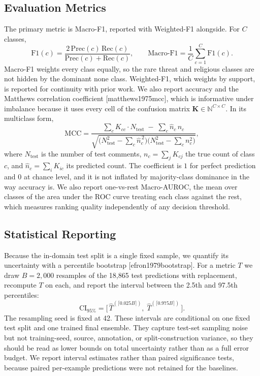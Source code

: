 \documentclass[11pt,a4paper]{article}
\def\citep#1{[#1]}%
\def\emph#1{#1}%
\begin{document}
\subsection{Evaluation Metrics}
\label{sec:metrics}

The primary metric is Macro-F1, reported with Weighted-F1 alongside. For $C$ classes,
\begin{equation}
\mathrm{F1}(c) = \frac{2\,\mathrm{Prec}(c)\,\mathrm{Rec}(c)}{\mathrm{Prec}(c) + \mathrm{Rec}(c)},
\qquad
\text{Macro-F1} = \frac{1}{C}\sum_{c=1}^{C} \mathrm{F1}(c).
\label{eq:macrof1}
\end{equation}
Macro-F1 weights every class equally, so the rare \emph{threat} and \emph{religious} classes are not hidden by the dominant \emph{none} class. Weighted-F1, which weights by support, is reported for continuity with prior work. We also report accuracy and the Matthews correlation coefficient \citep{matthews1975mcc}, which is informative under imbalance because it uses every cell of the confusion matrix $\mathbf{K} \in \mathbb{N}^{C \times C}$. In its multiclass form,
\begin{equation}
\mathrm{MCC} =
\frac{\sum_{c} K_{cc} \cdot N_{\mathrm{test}} \;-\; \sum_{c} \hat{n}_c\, n_c}
{\sqrt{\big(N_{\mathrm{test}}^2 - \sum_{c} \hat{n}_c^{\,2}\big)\big(N_{\mathrm{test}}^2 - \sum_{c} n_c^{2}\big)}},
\label{eq:mcc}
\end{equation}
where $N_{\mathrm{test}}$ is the number of test comments, $n_c = \sum_{j} K_{cj}$ the true count of class $c$, and $\hat{n}_c = \sum_{i} K_{ic}$ its predicted count. The coefficient is $1$ for perfect prediction and $0$ at chance level, and it is not inflated by majority-class dominance in the way accuracy is. We also report one-vs-rest Macro-AUROC, the mean over classes of the area under the ROC curve treating each class against the rest, which measures ranking quality independently of any decision threshold.

\subsection{Statistical Reporting}
\label{sec:stats}

Because the in-domain test split is a single fixed sample, we quantify its uncertainty with a percentile bootstrap \citep{efron1979bootstrap}. For a metric $T$ we draw $B = 2{,}000$ resamples of the 18{,}865 test predictions with replacement, recompute $T$ on each, and report the interval between the 2.5th and 97.5th percentiles:
\begin{equation}
\mathrm{CI}_{95\%} = \big[\, \hat{T}^{(\lceil 0.025 B \rceil)},\; \hat{T}^{(\lceil 0.975 B \rceil)} \,\big].
\label{eq:bootstrap}
\end{equation}
The resampling seed is fixed at 42. These intervals are conditional on one fixed test split and one trained final ensemble. They capture test-set sampling noise but not training-seed, source, annotation, or split-construction variance, so they should be read as lower bounds on total uncertainty rather than as a full error budget. We report interval estimates rather than paired significance tests, because paired per-example predictions were not retained for the baselines.
\end{document}
